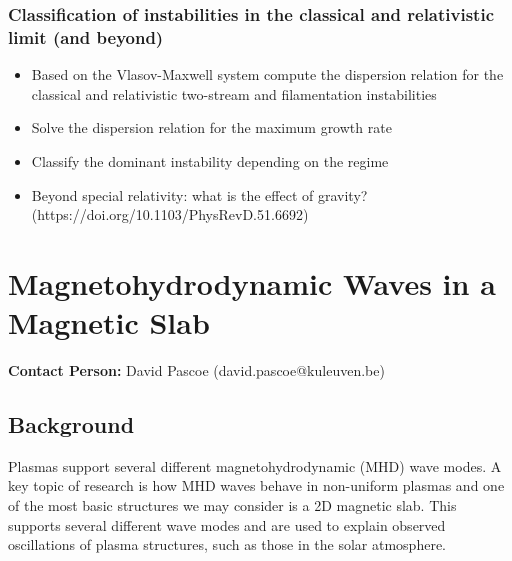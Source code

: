 \documentclass[11pt]{article}
\begin{document}
\subsubsection{Classification of instabilities in the classical and relativistic limit (and beyond)}
\begin{itemize}
\item Based on the Vlasov-Maxwell system compute the dispersion relation for the classical and relativistic two-stream and filamentation instabilities
\item Solve the dispersion relation for the maximum growth rate
\item Classify the dominant instability depending on the regime
\item Beyond special relativity: what is the effect of gravity? (https://doi.org/10.1103/PhysRevD.51.6692)
\end{itemize}

\newpage

\section{Magnetohydrodynamic Waves in a Magnetic Slab}
 {\bf Contact Person: } David Pascoe (david.pascoe@kuleuven.be)\\


\subsection{Background}

Plasmas support several different magnetohydrodynamic (MHD) wave modes.
A key topic of research is how MHD waves behave in non-uniform plasmas and one of the most basic structures we may consider is a 2D magnetic slab.
This supports several different wave modes and are used to explain observed oscillations of plasma structures, such as those in the solar atmosphere.

%
\end{document}
